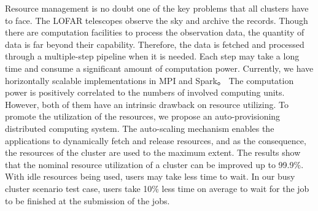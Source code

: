 


\begin{abstracts}        %

Resource management is no doubt one of the key problems that all clusters have to face. 
The LOFAR telescopes observe the sky and archive the records. 
Though there are computation facilities to process the observation data, the quantity of data is far beyond their capability. 
Therefore, the data is fetched and processed through a multiple-step pipeline when it is needed. 
Each step may take a long time and consume a significant amount of computation power. 
Currently, we have horizontally scalable implementations in MPI and Spark。
The computation power is positively correlated to the numbers of involved computing units.
However, both of them have an intrinsic drawback on resource utilizing. 
To promote the utilization of the resources, we propose an auto-provisioning distributed computing system. 
The auto-scaling mechanism enables the applications to dynamically fetch and release resources, and as the consequence,  the resources of the cluster are used to the maximum extent. 
The results show that the nominal resource utilization of a cluster can be improved up to 99.9\%. 
With idle resources being used, users may take less time to wait. 
In our busy cluster scenario test case, users take 10\% less time on average to wait for the job to be finished at the submission of the jobs.


\end{abstracts}


